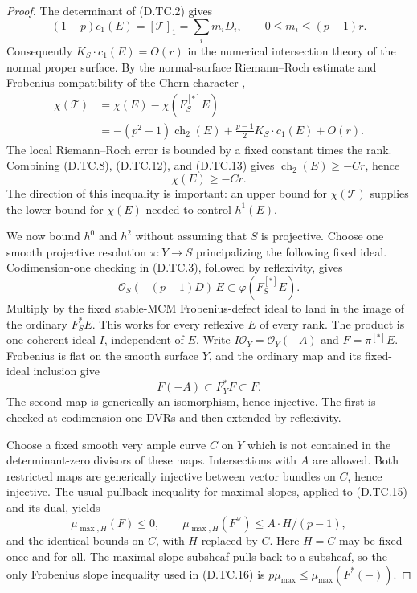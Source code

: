 \begin{proof}
The determinant of (D.TC.2) gives
\[
       (1-p)c_1(E)=[\mathcal T]_1
                    =\sum_i m_iD_i,\qquad
                    0\le m_i\le(p-1)r.                 \tag{D.TC.12}
\]
Consequently $K_S\cdot c_1(E)=O(r)$ in the numerical
intersection theory of the normal proper surface.
By the normal-surface Riemann--Roch estimate and Frobenius
compatibility of the Chern character
\citep[Theorem~0.1]{C_Langer2026}
\citep[Theorem~4.5(2)]{C_Langer2025},
\[
 \begin{split}
 \chi(\mathcal T)
   &=\chi(E)-\chi(F_S^{[*]}E)\\
   &=-(p^2-1)\operatorname{ch}_2(E)
                  +\frac{p-1}{2}K_S\cdot c_1(E)+O(r).
 \end{split}                                            \tag{D.TC.13}
\]
The local Riemann--Roch error is bounded by a fixed
constant times the rank.  Combining (D.TC.8),
(D.TC.12), and (D.TC.13) gives
$\operatorname{ch}_2(E)\ge-Cr$, hence
\[
                                  \chi(E)\ge-Cr.         \tag{D.TC.14}
\]
The direction of this inequality is important: an upper
bound for $\chi(\mathcal T)$ supplies the lower bound
for $\chi(E)$ needed to control $h^1(E)$.

We now bound $h^0$ and $h^2$ without assuming that $S$
is projective.  Choose one smooth projective resolution
$\pi:Y\to S$ principalizing the following fixed ideal.
Codimension-one checking in (D.TC.3), followed by
reflexivity, gives
\[
    \mathcal O_S(-(p-1)D)\,E
                       \subset \varphi(F_S^{[*]}E).
\]
Multiply by the fixed stable-MCM Frobenius-defect ideal
\citep[Theorem~1.1 and Remark~2.5(1)]{C_Kimura2025}
\citep[Lemma~1.8]{C_Langer2026}
to land in the image of the ordinary $F_S^*E$.
This works for every reflexive $E$ of every rank.  The
product is one coherent ideal $I$, independent of $E$.
Write $I\mathcal O_Y=\mathcal O_Y(-A)$ and
$F=\pi^{[*]}E$.  Frobenius is flat on the smooth surface
$Y$, and the ordinary map and its fixed-ideal inclusion
give
\[
                     F(-A)\subset F_Y^*F\subset F.       \tag{D.TC.15}
\]
The second map is generically an isomorphism, hence
injective.  The first is checked at codimension-one
DVRs and then extended by reflexivity.

Choose a fixed smooth very ample curve $C$ on $Y$ which
is not contained in the determinant-zero divisors of
these maps.  Intersections with $A$ are allowed.
Both restricted maps are generically injective between
vector bundles on $C$, hence injective.  The usual
pullback inequality for maximal slopes, applied to
(D.TC.15) and its dual, yields
\[
 \mu_{\max,H}(F)\le0,\qquad
 \mu_{\max,H}(F^\vee)\le A\cdot H/(p-1),
                                                        \tag{D.TC.16}
\]
and the identical bounds on $C$, with $H$ replaced by
$C$.  Here $H=C$ may be fixed once and for all.
The maximal-slope subsheaf pulls back to a subsheaf,
so the only Frobenius slope inequality used in
(D.TC.16) is $p\mu_{\max}\le\mu_{\max}(F^*(-))$.


\end{proof}
